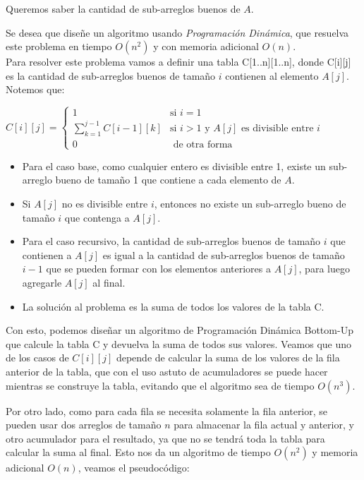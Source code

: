\documentclass[letterpaper, 12pt]{article}
\begin{document}
\begin{enumerate}
Queremos saber la cantidad de sub-arreglos buenos de $A$.

Se desea que diseñe un algoritmo usando \emph{Programación Dinámica}, que resuelva este problema en tiempo $O(n^2)$ y con memoria adicional $O(n)$. \\

Para resolver este problema vamos a definir una tabla C[1..n][1..n], donde C[i][j] es la cantidad de sub-arreglos buenos de tamaño $i$ contienen al elemento $A[j]$. Notemos que:

\begin{center}
    $C[i][j] = \begin{cases}
        1 & \text{si } i = 1 \\
        \sum_{k = 1}^{j - 1} C[i - 1][k] & \text{si } i > 1 \text{ y } A[j] \text{ es divisible entre } i \\
        0 & \text{ de otra forma }
    \end{cases}$
\end{center}

\begin{itemize}
    \item Para el caso base, como cualquier entero es divisible entre 1, existe un sub-arreglo bueno de tamaño 1 que contiene a cada elemento de $A$.
    \item Si $A[j]$ no es divisible entre $i$, entonces no existe un sub-arreglo bueno de tamaño $i$ que contenga a $A[j]$.
    \item Para el caso recursivo, la cantidad de sub-arreglos buenos de tamaño $i$ que contienen a $A[j]$ es igual a la cantidad de sub-arreglos buenos de tamaño $i - 1$ que se pueden formar con los elementos anteriores a $A[j]$, para luego agregarle $A[j]$ al final.
    \item La solución al problema es la suma de todos los valores de la tabla C.
\end{itemize}

Con esto, podemos diseñar un algoritmo de Programación Dinámica Bottom-Up que calcule la tabla C y devuelva la suma de todos sus valores. Veamos que uno de los casos de $C[i][j]$ depende de calcular la suma de los valores de la fila anterior de la tabla, que con el uso astuto de acumuladores se puede hacer mientras se construye la tabla, evitando que el algoritmo sea de tiempo $O(n^3)$.

Por otro lado, como para cada fila se necesita solamente la fila anterior, se pueden usar dos arreglos de tamaño $n$ para almacenar la fila actual y anterior, y otro acumulador para el resultado, ya que no se tendrá toda la tabla para calcular la suma al final. Esto nos da un algoritmo de tiempo $O(n^2)$ y memoria adicional $O(n)$, veamos el pseudocódigo:


\end{enumerate}
\end{document}
